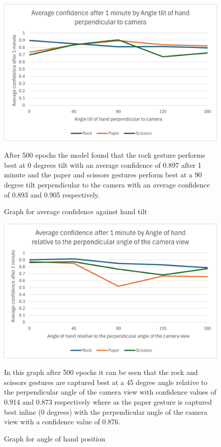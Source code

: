 \documentclass[conference]{IEEEtran}
\begin{document}
\begin{figure}[h]
    \includegraphics[width=1\linewidth]{Graph for hand tilt.png}
    \caption{Graph for average confidence against hand tilt}
    \label{testing data tilt}

    After 500 epochs the model found that the rock gesture performs best at 0 degrees tilt with an average confidence of 0.897 after 1 minute and the paper and scissors gestures perform best at a 90 degree tilt perpendicular to the camera with an average confidence of 0.893 and 0.905 respectively.
    
\end{figure}
\FloatBarrier



\begin{figure}[h]
    \centering
    \includegraphics[width=1\linewidth]{Graph for angle of hand relative to perpendicular angle of camera view.png}
    \caption{Graph for angle of hand position}
    \label{testing data position}

    In this graph after 500 epochs it can be seen that the rock and scissors gestures are captured best at a 45 degree angle relative to the perpendicular angle of the camera view with confidence values of 0.914 and 0.873 respectively where as the paper gesture is captured best inline (0 degrees) with the perpendicular angle of the camera view with a confidence value of 0.876.
    
\end{figure}
\FloatBarrier
\end{document}
